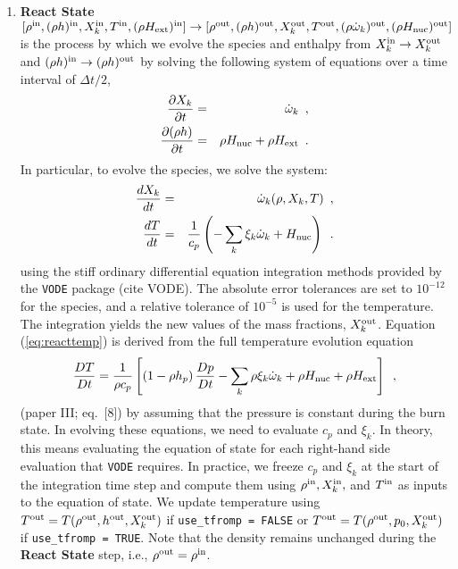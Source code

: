 \begin{enumerate}
\item {\bf React State}$[\rho^{\mathrm{in}},(\rho h)^{\mathrm{in}},X_k^{\mathrm{in}},T^{\mathrm{in}}, (\rho{H_{\rm ext}})^{\mathrm{in}}]\rightarrow [\rho^{\mathrm{out}}, (\rho h)^{\mathrm{out}}, X_k^{\mathrm{out}}, T^{\mathrm{out}}, (\rho \dot{\omega}_k)^{\mathrm{out}}, (\rho{H_{\rm nuc}})^{\mathrm{out}}]$ \\
is the process by which we evolve the species and enthalpy from 
$X_k^{\mathrm{in}} \rightarrow X_k^{\mathrm{out}}$ 
and $(\rho h)^{\mathrm{in}} \rightarrow (\rho h)^{\mathrm{out}}$ by solving the following 
system of equations over a time interval of  $\Delta t/2$,
\begin{eqnarray}
\frac{\partial X_k}{\partial t} &=& \dot{\omega}_k\enskip,\\
\frac{\partial (\rho h)}{\partial t} &=& \rho {H_{\rm nuc}} + \rho {H_{\rm ext}}\enskip .
\end{eqnarray}
  In particular, to evolve the species, we solve the system:
\begin{eqnarray}
\frac{dX_k}{dt} &=& \dot{\omega}_k(\rho,X_k,T)\enskip, \\
\frac{dT}{dt} &=&\frac{1}{c_p} \left ( -\sum_k \xi_k  \dot{\omega}_k  + {H_{\rm nuc}} \right )
\enskip. \label{eq:reacttemp}
\end{eqnarray}
using the stiff ordinary differential equation integration methods
provided by the {\tt VODE} package (cite VODE).  The absolute error
tolerances are set to $10^{-12}$ for the species, and a relative
tolerance of $10^{-5}$ is used for the temperature.  The integration
yields the new values of the mass fractions, $X_k^{\mathrm{out}}$.  Equation
(\ref{eq:reacttemp}) is derived from the full temperature evolution equation
\begin{equation}
\label{eq:tempenthalpy}
\frac{DT}{Dt} = \frac{1}{\rho c_p} \left[ \left(1 - \rho h_p\right) \frac{D p}{D t}
 - \sum_k \rho \xi_k {\dot{\omega}}_k 
 + \rho {H_{\rm nuc}} + \rho {H_{\rm ext}} \right] \enskip , 
\end{equation}
(paper III; eq.~[8])
by assuming that the pressure is constant during the burn state.  In
evolving these equations, we need to evaluate $c_p$ and $\xi_k$.  In
theory, this means evaluating the equation of state for each
right-hand side evaluation that {\tt VODE} requires.  In practice, we
freeze $c_p$ and $\xi_k$ at the start of the integration time step and
compute them using $\rho^{\mathrm{in}}, X_k^{\mathrm{in}},$ and $T^{\mathrm{in}}$ as inputs
to the equation of state.  We update temperature using
$T^{\mathrm{out}} = T(\rho^{\mathrm{out}},h^{\mathrm{out}},X_k^{\mathrm{out}})$ if {\tt use\_tfromp = FALSE} or 
$T^{\mathrm{out}} = T(\rho^{\mathrm{out}},p_0,X_k^{\mathrm{out}})$  if {\tt use\_tfromp = TRUE}.  
Note that the density remains unchanged
during the {\bf React State} step, i.e., $\rho^{\mathrm{out}} = \rho^{\mathrm{in}}$.


\end{enumerate}
